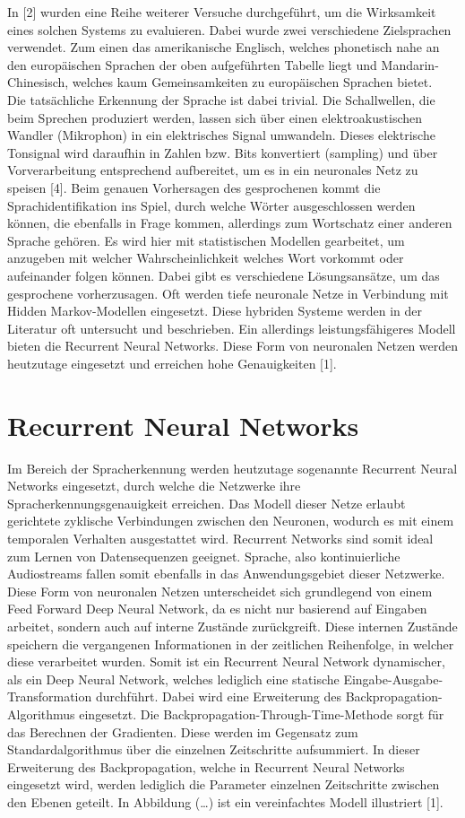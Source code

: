 In [2] wurden eine Reihe weiterer Versuche durchgeführt, um die Wirksamkeit eines solchen Systems zu evaluieren. Dabei wurde zwei verschiedene Zielsprachen verwendet. Zum einen das amerikanische Englisch, welches phonetisch nahe an den europäischen Sprachen der oben aufgeführten Tabelle liegt und Mandarin-Chinesisch, welches kaum Gemeinsamkeiten zu europäischen Sprachen bietet. 
\\
Die tatsächliche Erkennung der Sprache ist dabei trivial. Die Schallwellen, die beim Sprechen produziert werden, lassen sich über einen elektroakustischen Wandler (Mikrophon) in ein elektrisches Signal umwandeln. Dieses elektrische Tonsignal wird daraufhin in Zahlen bzw. Bits konvertiert (sampling) und über Vorverarbeitung entsprechend aufbereitet, um es in ein neuronales Netz zu speisen [4]. Beim genauen Vorhersagen des gesprochenen kommt die Sprachidentifikation ins Spiel, durch welche Wörter ausgeschlossen werden können, die ebenfalls in Frage kommen, allerdings zum Wortschatz einer anderen Sprache gehören. Es wird hier mit statistischen Modellen gearbeitet, um anzugeben mit welcher Wahrscheinlichkeit welches Wort vorkommt oder aufeinander folgen können. Dabei gibt es verschiedene Lösungsansätze, um das gesprochene vorherzusagen. Oft werden tiefe neuronale Netze in Verbindung mit Hidden Markov-Modellen eingesetzt. Diese hybriden Systeme werden in der Literatur oft untersucht und beschrieben. Ein allerdings leistungsfähigeres Modell bieten die Recurrent Neural Networks. Diese Form von neuronalen Netzen werden heutzutage eingesetzt und erreichen hohe Genauigkeiten [1].


\section{Recurrent Neural Networks}
Im Bereich der Spracherkennung werden heutzutage sogenannte Recurrent Neural Networks eingesetzt, durch welche die Netzwerke ihre Spracherkennungsgenauigkeit erreichen. Das Modell dieser Netze erlaubt gerichtete zyklische Verbindungen zwischen den Neuronen, wodurch es mit einem temporalen Verhalten ausgestattet wird. Recurrent Networks sind somit ideal zum Lernen von Datensequenzen geeignet. Sprache, also kontinuierliche Audiostreams fallen somit ebenfalls in das Anwendungsgebiet dieser Netzwerke. Diese Form von neuronalen Netzen unterscheidet sich grundlegend von einem Feed Forward Deep Neural Network, da es nicht nur basierend auf Eingaben arbeitet, sondern auch auf interne Zustände zurückgreift. Diese internen Zustände speichern die vergangenen Informationen in der zeitlichen Reihenfolge, in welcher diese verarbeitet wurden. Somit ist ein Recurrent Neural Network dynamischer, als ein Deep Neural Network, welches lediglich eine statische Eingabe-Ausgabe-Transformation durchführt. Dabei wird eine Erweiterung des Backpropagation-Algorithmus eingesetzt. Die Backpropagation-Through-Time-Methode sorgt für das Berechnen der Gradienten. Diese werden im Gegensatz zum Standardalgorithmus über die einzelnen Zeitschritte aufsummiert. In dieser Erweiterung des Backpropagation, welche in Recurrent Neural Networks eingesetzt wird, werden lediglich die Parameter einzelnen Zeitschritte zwischen den Ebenen geteilt. In Abbildung (…) ist ein vereinfachtes Modell illustriert [1].

